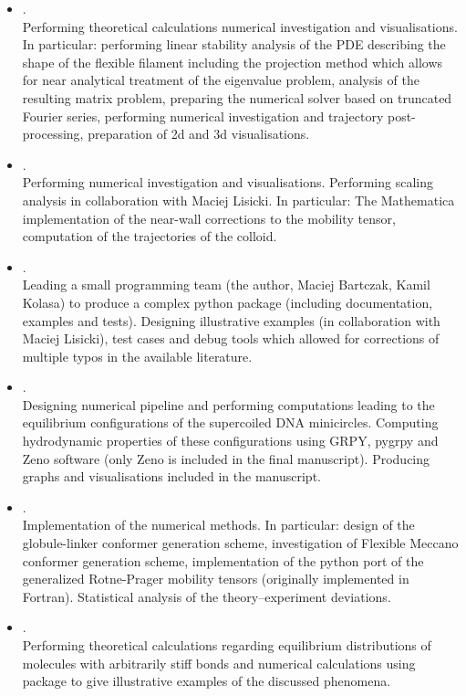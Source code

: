 \documentclass{doctoral}
\newcommand{\code}[1]{\texttt{\detokenize{#1}}}
\begin{document}
\begin{itemize}
    \item {}.\\
    Performing theoretical calculations numerical investigation and visualisations. In particular: performing linear stability analysis of the PDE describing the shape of the flexible filament including the projection method which allows for near analytical treatment of the eigenvalue problem, analysis of the resulting matrix problem, preparing the numerical solver based on truncated Fourier series, performing numerical investigation and trajectory post-processing, preparation of 2d and 3d visualisations.
    
    \item {}.\\
    Performing numerical investigation and visualisations. Performing scaling analysis in collaboration with Maciej Lisicki. 
    In particular: The Mathematica implementation of the near-wall corrections to the mobility tensor\cite{Lisicki_2016}, computation of the trajectories of the colloid.
    
    \item {}.\\
    Leading a small programming team (the author, Maciej Bartczak, Kamil Kolasa) to produce a complex python package (including documentation, examples and tests). Designing illustrative examples (in collaboration with Maciej Lisicki), test cases and debug tools which allowed for corrections of multiple typos in the available literature.

    \item {}.\\
    Designing numerical pipeline and performing computations leading to the equilibrium configurations of the supercoiled DNA minicircles. Computing hydrodynamic properties of these configurations using GRPY, pygrpy and Zeno software (only Zeno is included in the final manuscript). Producing graphs and visualisations included in the manuscript.

    \item {}.\\
    Implementation of the numerical methods. In particular: design of the globule-linker conformer generation scheme, investigation of Flexible Meccano conformer generation scheme, implementation of the python port \code{pygrpy} of the generalized Rotne-Prager mobility tensors (originally implemented in Fortran\cite{Zuk_2018}). Statistical analysis of the theory--experiment deviations.

    \item {}.\\
    Performing theoretical calculations regarding equilibrium distributions of molecules with arbitrarily stiff bonds and numerical calculations using \code{pychastic} package to give illustrative examples of the discussed phenomena.
\end{itemize}
\end{document}
